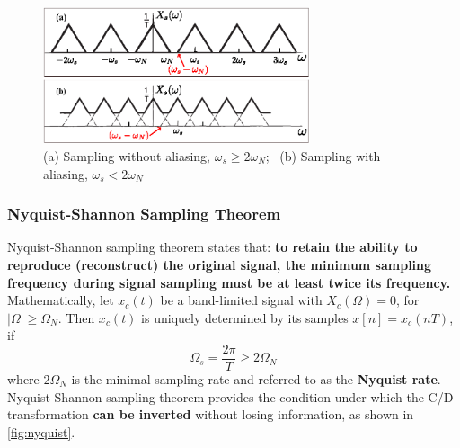 \begin{figure}[H]
    \centering
    \includegraphics[width = 0.7\textwidth]{images/sampling_aliasing.eps}
    \caption{(a) Sampling without aliasing, $\omega_{s} \geq 2\omega_{N}$; \ (b) Sampling with aliasing, $\omega_{s} < 2\omega_{N}$} 
    \label{fig:aliasing}
\end{figure}



\subsubsection{Nyquist-Shannon Sampling Theorem}
Nyquist-Shannon sampling theorem states that: \textbf{to retain the ability to reproduce (reconstruct) the original signal, the minimum sampling frequency during signal sampling must be at least twice its frequency.}\\

Mathematically, let $x_{c}(t)$ be a band-limited signal with $X_{c}(\Omega)=0$, for $\lvert \Omega \rvert \geq \Omega_{N}$. Then $x_{c}(t)$ is uniquely determined by its samples $x[n] = x_{c}(nT)$, if 
\[ \Omega_{s}=\frac{2\pi}{T} \geq 2\Omega_{N} \]
where $2\Omega_{N}$ is the minimal sampling rate and referred to as the \textbf{Nyquist rate}.\\

Nyquist-Shannon sampling theorem provides the condition under which the C/D transformation \textbf{can be inverted} without losing information, as shown in \autoref{fig:nyquist}.

